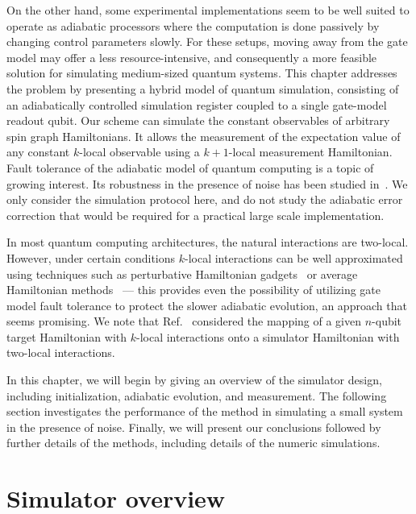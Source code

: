 \documentclass[11pt,oneside,final]{huthesis}%
\begin{document}
On the other hand, some experimental implementations seem to be well suited to
operate as adiabatic processors where the computation is done passively by changing control parameters slowly.
For these setups, moving away from the gate model may offer a less
resource-intensive, and consequently a more feasible solution
for simulating medium-sized quantum systems.
This chapter addresses the problem by presenting a 
hybrid model of quantum simulation,
consisting of an adiabatically controlled simulation
register coupled to a single gate-model readout qubit.
Our scheme can simulate the constant observables
of arbitrary spin graph Hamiltonians.
It allows the measurement of the expectation value of any
constant $k$-local observable using a $k+1$-local measurement Hamiltonian. 
Fault tolerance of the adiabatic model of quantum computing is a topic of growing interest.  
Its robustness in the presence of noise has been studied in~\cite{Childs01,Amin08}. 
We only consider the simulation protocol here, and do not study the
adiabatic error correction that would be required for a
practical large scale implementation. 

In most quantum computing architectures, the natural interactions are
two-local. However, under certain conditions $k$-local
interactions can be well approximated using techniques such as
perturbative Hamiltonian gadgets~\cite{Kempe06,Oliveira08,Biamonte08,Biamonte08classical}
or average Hamiltonian methods~\cite{Waugh68} --- this
provides even the possibility of utilizing gate model fault tolerance
to protect the slower adiabatic evolution, an approach that seems promising.  We note that Ref.~\cite{Bravyi08perturb} considered the mapping of
a given $n$-qubit target Hamiltonian with $k$-local interactions onto a
simulator Hamiltonian with two-local interactions.


In this chapter, we will begin by giving an overview of the simulator design,
including initialization, adiabatic evolution, and
measurement.
The following section investigates the performance of the method in
simulating a small system in the presence of noise.
Finally, we will present our conclusions followed by further details of the methods,
including details of the numeric simulations. 


\section{Simulator overview}
\end{document}
